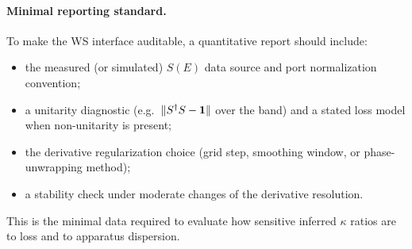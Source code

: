 \paragraph{Minimal reporting standard.}
To make the WS interface auditable, a quantitative report should include:
\begin{itemize}
  \item the measured (or simulated) $S(E)$ data source and port normalization convention;
  \item a unitarity diagnostic (e.g.\ $\|S^\dagger S-\mathbf{1}\|$ over the band) and a stated loss model when non-unitarity is present;
  \item the derivative regularization choice (grid step, smoothing window, or phase-unwrapping method);
  \item a stability check under moderate changes of the derivative resolution.
\end{itemize}
This is the minimal data required to evaluate how sensitive inferred $\kappa$ ratios are to loss and to apparatus dispersion.



